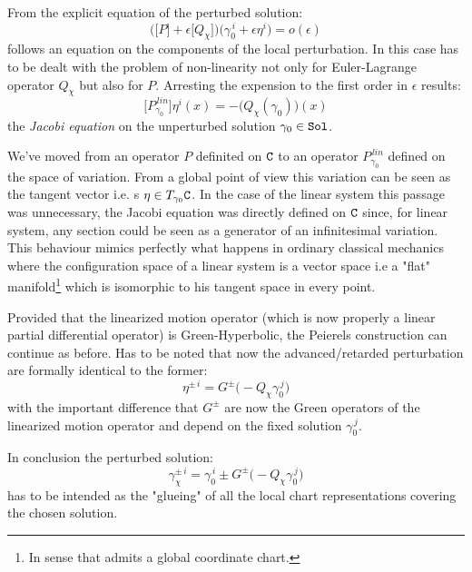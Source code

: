 \documentclass[Main]{subfiles}
\begin{document}
		From the explicit equation of the perturbed solution: 
		\begin{displaymath}
			\biggr(\big[P\big] + \epsilon\big[Q_\chi\big] \biggr) \big(\gamma_0^{\,i}+\epsilon \eta^i \big) = o(\epsilon)
		\end{displaymath}
		follows an equation on the components of the local perturbation.
		In  this case has to be dealt with the problem of non-linearity not only for Euler-Lagrange operator $Q_\chi$ but also for $P$.
		Arresting the expension to the first order in $\epsilon$ results:
		\begin{equation}\label{PeierlJacobiEqNonLin}
			\biggr[P_{\gamma_0}^{\, lin} \biggr] \eta^i(x) = -\biggr(Q_\chi(\gamma_0)\biggr)(x)
		\end{equation}
		the \emph{Jacobi equation} on the unperturbed solution $\gamma_0\in \mathtt{Sol}$.
		\begin{observation}
			We've moved from an operator $P$  definited on  $\mathtt{C}$ to an operator  $P_{\gamma_0}^{\, lin}  $ defined on the space of variation.
			From a global point of view this variation can be seen as the tangent vector i.e. s  $\eta \in T_{\gamma_0}\mathtt{C}$.
			In the case of the linear system this passage was unnecessary, the Jacobi equation was directly defined on $\mathtt{C}$ since, for linear system, any section could be seen as a generator of an infinitesimal variation.
			This behaviour mimics perfectly what happens in ordinary classical mechanics where the configuration space of a linear system is a vector space i.e a "flat" manifold\footnote{In sense that admits a global coordinate chart.} which is isomorphic to his tangent space in every point.
		\end{observation}
		
		Provided that the linearized motion operator (which is now properly a linear partial differential operator) is Green-Hyperbolic, the Peierels construction can continue as before.
		Has to be noted that now the advanced/retarded perturbation are formally identical to the former:
		\begin{displaymath}
			\eta^{\pm\, i} = G^\pm \big( - Q_\chi \gamma_0^{\, j})
		\end{displaymath}
		with the important difference that $G^\pm$ are now the Green operators of the linearized motion operator and depend on the fixed solution $\gamma_0^{\, j}$.
		
		In conclusion the perturbed solution:
		\begin{displaymath}
			\gamma_{\chi}^{\pm\,i} = \gamma_0^{\, i} \pm G^\pm \big( -Q_\chi \gamma_0^{\,j}\big)
		\end{displaymath}
		has to be intended as the "glueing" of all the local chart representations covering the chosen solution.
\end{document}
